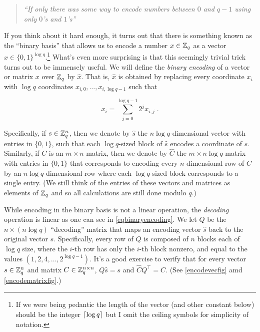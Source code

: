 \begin{quote}
\emph{``If only there was some way to encode numbers between \(0\) and
\(q-1\) using only \(0\)'s and \(1\)'s''}
\end{quote}

If you think about it hard enough, it turns out that there is something
known as the ``binary basis'' that allows us to encode a number
\(x\in{\mathbb{Z}}_q\) as a vector \(\hat{x}\in\{0,1\}^{\log q}\).\footnote{If we
  were being pedantic the length of the vector (and other constant
  below) should be the integer \(\lceil \log q \rceil\) but I omit the ceiling
  symbols for simplicity of notation.} What's even more surprising is
that this seemingly trivial trick turns out to be immensely useful. We
will define the \emph{binary encoding} of a vector or matrix \(x\) over
\({\mathbb{Z}}_q\) by \(\hat{x}\). That is, \(\hat{x}\) is obtained by replacing
every coordinate \(x_i\) with \(\log q\) coordinates
\(x_{i,0},\ldots,x_{i,\log q-1}\) such that

\[x_i = \sum_{j=0}^{\log q-1}2^j x_{i,j} \;. \label{eqbinaryencoding}\]

Specifically, if \(s\in {\mathbb{Z}}_q^n\), then we denote by \(\hat{s}\) the
\(n\log q\)-dimensional vector with entries in \(\{0,1\}\), such that
each \(\log q\)-sized block of \(\hat{s}\) encodes a coordinate of
\(s\). Similarly, if \(C\) is an \(m\times n\) matrix, then we denote by
\(\hat{C}\) the \(m\times n\log q\) matrix with entries in \(\{0,1\}\)
that corresponds to encoding every \(n\)-dimensional row of \(C\) by an
\(n\log q\)-dimensional row where each \(\log q\)-sized block
corresponds to a single entry. (We still think of the entries of these
vectors and matrices as elements of \({\mathbb{Z}}_q\) and so all calculations are
still done modulo \(q\).)

While encoding in the binary basis is not a linear operation, the
\emph{decoding} operation is linear as one can see in
\eqref{eqbinaryencoding}. We let \(Q\) be the \(n \times (n\log q)\)
``decoding'' matrix that maps an encoding vector \(\hat{s}\) back to the
original vector \(s\). Specifically, every row of \(Q\) is composed of
\(n\) blocks each of \(\log q\) size, where the \(i\)-th row has only
the \(i\)-th block nonzero, and equal to the values
\((1,2,4,\ldots,2^{\log q-1})\). It's a good exercise to verify that for
every vector \(s\in {\mathbb{Z}}_q^n\) and matrix \(C\in {\mathbb{Z}}_q^{n\times n}\),
\(Q\hat{s}=s\) and \(\hat{C}Q^\top =C\). (See \cref{encodevecfig} amd
\cref{encodematrixfig}.)

